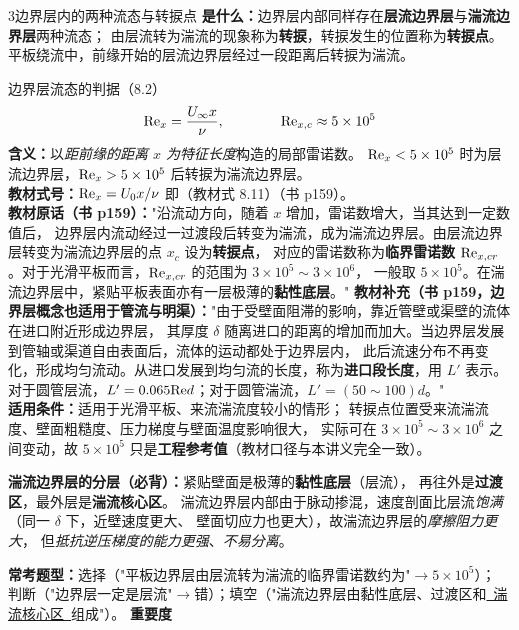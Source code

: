 \begin{kaodian}{3}{边界层内的两种流态与转捩点}
\textbf{是什么：}边界层内部同样存在\textbf{层流边界层}与\textbf{湍流边界层}两种流态；
由层流转为湍流的现象称为\textbf{转捩}，转捩发生的位置称为\textbf{转捩点}。
平板绕流中，前缘开始的层流边界层经过一段距离后转捩为湍流。

\begin{gongshi}{边界层流态的判据（8.2）}
\[ \mathrm{Re}_x=\frac{U_\infty x}{\nu},\qquad\qquad \mathrm{Re}_{x,c}\approx5\times10^5 \]
\textbf{含义：}以\emph{距前缘的距离 $x$ 为特征长度}构造的局部雷诺数。
$\mathrm{Re}_x<5\times10^5$ 时为层流边界层，$\mathrm{Re}_x>5\times10^5$ 后转捩为湍流边界层。\\
\textbf{教材式号：}$\mathrm{Re}_x=U_0x/\nu$ 即（教材式 8.11）（书 p159）。\\
\textbf{教材原话（书 p159）：}"沿流动方向，随着 $x$ 增加，雷诺数增大，当其达到一定数值后，
边界层内流动经过一过渡段后转变为湍流，成为湍流边界层。由层流边界层转变为湍流边界层的点 $x_c$ 设为\textbf{转捩点}，
对应的雷诺数称为\textbf{临界雷诺数} $\mathrm{Re}_{x,cr}$。对于光滑平板而言，$\mathrm{Re}_{x,cr}$ 的范围为 $3\times10^5\sim3\times10^6$，
一般取 $5\times10^5$。在湍流边界层中，紧贴平板表面亦有一层极薄的\textbf{黏性底层}。"
\textbf{教材补充（书 p159，边界层概念也适用于管流与明渠）：}"由于受壁面阻滞的影响，靠近管壁或渠壁的流体在进口附近形成边界层，
其厚度 $\delta$ 随离进口的距离的增加而加大。当边界层发展到管轴或渠道自由表面后，流体的运动都处于边界层内，
此后流速分布不再变化，形成均匀流动。从进口发展到均匀流的长度，称为\textbf{进口段长度}，用 $L'$ 表示。
对于圆管层流，$L'=0.065\mathrm{Re} d$；对于圆管湍流，$L'=(50\sim100)d$。"\\
\textbf{适用条件：}适用于光滑平板、来流湍流度较小的情形；
转捩点位置受来流湍流度、壁面粗糙度、压力梯度与壁面温度影响很大，
实际可在 $3\times10^5\sim3\times10^6$ 之间变动，故 $5\times10^5$ 只是\textbf{工程参考值}（教材口径与本讲义完全一致）。
\end{gongshi}

\textbf{湍流边界层的分层（必背）：}紧贴壁面是极薄的\textbf{黏性底层}（层流），
再往外是\textbf{过渡区}，最外层是\textbf{湍流核心区}。
湍流边界层内部由于脉动掺混，速度剖面比层流\emph{饱满}（同一 $\delta$ 下，近壁速度更大、
壁面切应力也更大），故湍流边界层的\emph{摩擦阻力更大}，
但\emph{抵抗逆压梯度的能力更强}、\emph{不易分离}。

\textbf{常考题型：}选择（"平板边界层由层流转为湍流的临界雷诺数约为"$\to5\times10^5$）；
判断（"边界层一定是层流"$\to$错）；填空（"湍流边界层由黏性底层、过渡区和\underline{\ 湍流核心区\ }组成"）。
\textbf{重要度 }\quad{}\quad{}


\end{kaodian}
